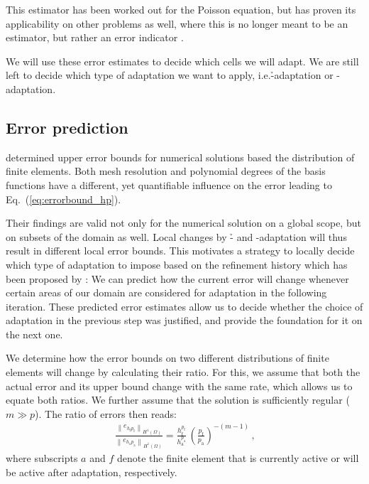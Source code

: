 This estimator has been worked out for the Poisson equation, but has proven its applicability on other problems as well, where this is no longer meant to be an estimator, but rather an error indicator \cite{dealiikelly}.

We will use these error estimates to decide which cells we will adapt. We are still left to decide which type of adaptation we want to apply, i.e.\@ \h-adaptation or \p-adaptation.



\subsection{Error prediction}
\label{ssec:prediction}

\cite{babuska1990} determined upper error bounds for numerical solutions based the distribution of finite elements. Both mesh resolution and polynomial degrees of the basis functions have a different, yet quantifiable influence on the error leading to Eq.~(\ref{eq:errorbound_hp}).

Their findings are valid not only for the numerical solution on a global scope, but on subsets of the domain as well. Local changes by \h- and \p-adaptation will thus result in different local error bounds. This motivates a strategy to locally decide which type of adaptation to impose based on the refinement history which has been proposed by \textcite{melenk2001}: We can predict how the current error will change whenever certain areas of our domain are considered for adaptation in the following iteration. These predicted error estimates allow us to decide whether the choice of adaptation in the previous step was justified, and provide the foundation for it on the next one.

We determine how the error bounds on two different distributions of finite elements will change by calculating their ratio. For this, we assume that both the actual error and its upper bound change with the same rate, which allows us to equate both ratios. We further assume that the solution is sufficiently regular ($m \gg p$). The ratio of errors then reads:
\begin{align}
\label{eq:errorratio_hp} \frac{\left\|e_{h_\text{f} p_\text{f}}\right\|_{H^{1}(\Omega)}}{\left\|e_{h_\text{a} p_\text{a}}\right\|_{H^{1}(\Omega)}} = \frac{h_\text{f}^{p_\text{f}}}{h_\text{a}^{p_\text{a}}} \, \left(\frac{p_\text{f}}{p_\text{a}}\right)^{-(m-1)} \,\text{,}
\end{align}
where subscripts $a$ and $f$ denote the finite element that is currently active or will be active after adaptation, respectively.

